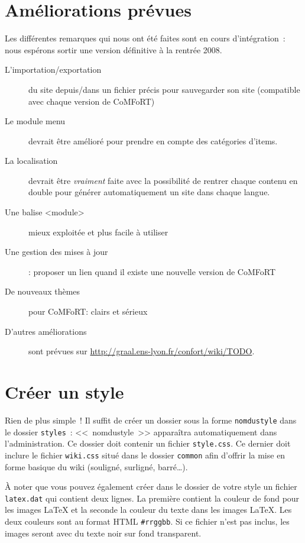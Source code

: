 \documentclass[final,11pt,a4paper,twoside,titlepage]{article}
\newcommand{\code}[1]{\texttt{#1}}
\begin{document}
{  \section{Améliorations prévues}
    Les différentes remarques qui nous ont été faites sont en cours
    d'intégration~: nous espérons sortir une version définitive à la rentrée
    2008.
    \begin{description}
      \item[L'importation/exportation] du site depuis/dans un fichier précis
        pour sauvegarder son site (compatible avec chaque version de CoMFoRT)
      \item[Le module menu] devrait être amélioré pour prendre en compte des
        catégories d'items.
      \item[La localisation] devrait être \emph{vraiment} faite avec la
        possibilité de rentrer chaque contenu en double pour générer
        automatiquement un site dans chaque langue.
      \item[Une balise <module>] mieux exploitée et plus facile à utiliser
      \item[Une gestion des mises à jour]: proposer un lien quand il existe une
        nouvelle version de CoMFoRT
      \item[De nouveaux thèmes] pour CoMFoRT: clairs et sérieux     
      \item[D'autres améliorations] sont prévues sur
        \url{http://graal.ens-lyon.fr/confort/wiki/TODO}. 
    \end{description}

  \section{Créer un style}
    Rien de plus simple~! Il suffit de créer un dossier sous la forme
    \code{nomdustyle} dans le dossier \code{styles}~: <<~nomdustyle~>>
    apparaîtra automatiquement dans l'administration. Ce dossier doit contenir
    un fichier \code{style.css}. Ce dernier doit inclure le fichier
    \code{wiki.css} situé dans le dossier \code{common} afin d'offrir la mise en
    forme basique du wiki (souligné, surligné, barré\ldots).

    À noter que vous pouvez également créer dans le dossier de votre style un
    fichier \code{latex.dat} qui contient deux lignes. La première contient la
    couleur de fond pour les images \LaTeX{} et la seconde la couleur du texte
    dans les images \LaTeX{}. Les deux couleurs sont au format HTML
    \code{\#rrggbb}. Si ce fichier n'est pas inclus, les images seront avec du
    texte noir sur fond transparent.

}
\end{document}
